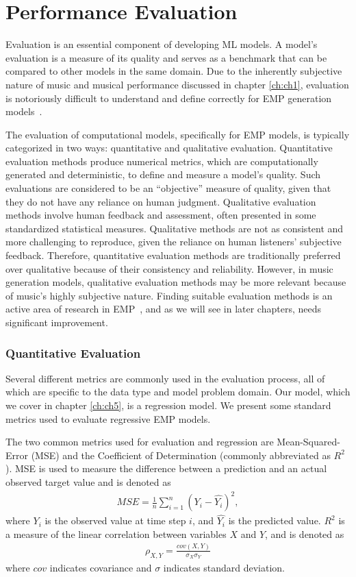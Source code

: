 \section{Performance Evaluation}\label{sec:evaluation}
Evaluation is an essential component of developing ML models. A model's evaluation is a measure of its quality and serves as a benchmark that can be compared to other models in the same domain. Due to the inherently subjective nature of music and musical performance discussed in chapter \ref{ch:ch1}, evaluation is notoriously difficult to understand and define correctly for EMP generation models~\cite{cancino2018computational}. 

The evaluation of computational models, specifically for EMP models, is typically categorized in two ways: quantitative and qualitative evaluation. Quantitative evaluation methods produce numerical metrics, which are computationally generated and deterministic, to define and measure a model's quality. Such evaluations are considered to be an ``objective'' measure of quality, given that they do not have any reliance on human judgment. Qualitative evaluation methods involve human feedback and assessment, often presented in some standardized statistical measures. Qualitative methods are not as consistent and more challenging to reproduce, given the reliance on human listeners' subjective feedback. Therefore, quantitative evaluation methods are traditionally preferred over qualitative because of their consistency and reliability. However, in music generation models, qualitative evaluation methods may be more relevant because of music's highly subjective nature. Finding suitable evaluation methods is an active area of research in EMP~\cite{cancino2018computational}, and as we will see in later chapters, needs significant improvement. 

\subsubsection{Quantitative Evaluation}
Several different metrics are commonly used in the evaluation process, all of which are specific to the data type and model problem domain. Our model, which we cover in chapter \ref{ch:ch5}, is a regression model. We present some standard metrics used to evaluate regressive EMP models. 

The two common metrics used for evaluation and regression are Mean-Squared-Error (MSE) and the Coefficient of Determination (commonly abbreviated as $R^2$). MSE is used to measure the difference between a prediction and an actual observed target value and is denoted as 
\begin{align*}
MSE = \frac{1}{n}\sum_{i=1}^{n}(Y_i - \hat{Y_i})^2,
\end{align*}
where $Y_i$ is the observed value at time step $i$, and $\hat{Y_i}$ is the predicted value. $R^2$ is a measure of the linear correlation between variables $X$ and $Y$, and is denoted as 
\begin{align*}
\rho_{X,Y} = \frac{cov(X,Y)}{\sigma_{X}\sigma_{Y}}   
\end{align*}
where $cov$ indicates covariance and $\sigma$ indicates standard deviation.


